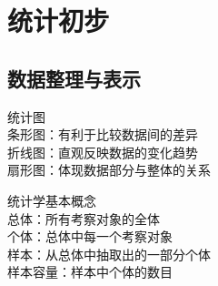 \documentclass{ecnuthesis}
\begin{document}
\chapter{统计初步}
\section{数据整理与表示}
\begin{knowledge}
    统计图 \\
    条形图：有利于比较数据间的差异 \\
    折线图：直观反映数据的变化趋势 \\
    扇形图：体现数据部分与整体的关系
\end{knowledge}
\begin{knowledge}
    统计学基本概念 \\
    总体：所有考察对象的全体 \\
    个体：总体中每一个考察对象 \\
    样本：从总体中抽取出的一部分个体 \\
    样本容量：样本中个体的数目
\end{knowledge}
\clearpage
\end{document}
